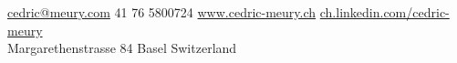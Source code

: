 \documentclass[10pt,a4paper]{article}
\begin{document}
\sloppy  %


\nobreakvspace{0.3em}  %

\noindent\href{mailto:cedric@meury.com}{cedric@meury.com}\sbull
\textsmaller{+}41 76 5800724\sbull
\href{http://www.cedric-meury.ch/}{www.cedric-meury.ch}\sbull
\href{http://ch.linkedin.com/pub/cedric-meury/29/65/b96/}{ch.linkedin.com/cedric-meury}
\\
Margarethenstrasse 84 Basel\sbull
Switzerland

\spacedhrule{0.9em}{-0.4em}  %

\end{document}
